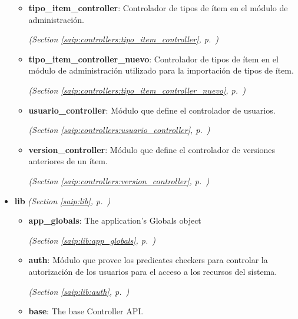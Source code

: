 \begin{itemize}
\begin{itemize}
    \item \textbf{tipo\_item\_controller}: Controlador de tipos de ítem en el módulo de administración.



  \textit{(Section \ref{saip:controllers:tipo_item_controller}, p.~\pageref{saip:controllers:tipo_item_controller})}

    \item \textbf{tipo\_item\_controller\_nuevo}: Controlador de tipos de ítem en el módulo de administración utilizado para 
la importación de tipos de ítem.



  \textit{(Section \ref{saip:controllers:tipo_item_controller_nuevo}, p.~\pageref{saip:controllers:tipo_item_controller_nuevo})}

    \item \textbf{usuario\_controller}: Módulo que define el controlador de usuarios.



  \textit{(Section \ref{saip:controllers:usuario_controller}, p.~\pageref{saip:controllers:usuario_controller})}

    \item \textbf{version\_controller}: Módulo que define el controlador de versiones anteriores de un ítem.



  \textit{(Section \ref{saip:controllers:version_controller}, p.~\pageref{saip:controllers:version_controller})}

  \end{itemize}
\item \textbf{lib}
  \textit{(Section \ref{saip:lib}, p.~\pageref{saip:lib})}

  \begin{itemize}
\setlength{\parskip}{0ex}
    \item \textbf{app\_globals}: The application's Globals object



  \textit{(Section \ref{saip:lib:app_globals}, p.~\pageref{saip:lib:app_globals})}

    \item \textbf{auth}: Módulo que provee los predicates checkers para controlar la autorización de
los usuarios para el acceso a los recursos del sistema.



  \textit{(Section \ref{saip:lib:auth}, p.~\pageref{saip:lib:auth})}

    \item \textbf{base}: The base Controller API.




\end{itemize}
\end{itemize}
